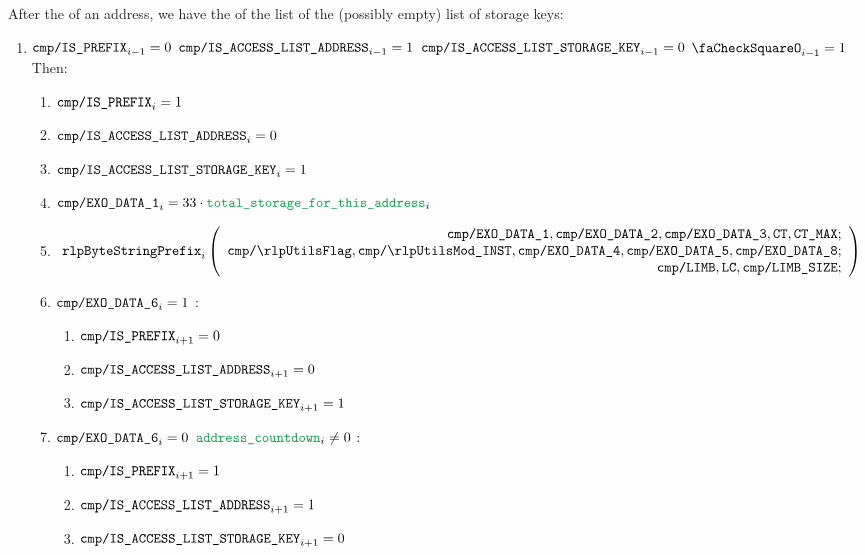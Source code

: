 \begin{enumerate}[resume]
		After the \rlp{} of an address, we have the \rlp{} of the list of the (possibly empty) list of storage keys:
		\begin{enumerate}[resume]
			\item \If $\texttt{cmp}\texttt{/}\texttt{{\texttt{IS\_PREFIX}}} _{i - 1} = 0$ \et $\texttt{cmp}\texttt{/}\texttt{{IS\_ACCESS\_LIST\_ADDRESS}} _{i - 1} = 1$ \et $\texttt{cmp}\texttt{/}\texttt{{IS\_ACCESS\_LIST\_STORAGE\_KEY}} _{i - 1} = 0$ \et $\done _{i - 1} =1$ Then:
				\begin{enumerate}
					\item $\texttt{cmp}\texttt{/}\texttt{{\texttt{IS\_PREFIX}}} _{i} = 1$
					\item $\texttt{cmp}\texttt{/}\texttt{{IS\_ACCESS\_LIST\_ADDRESS}}   _{i} = 0$
					\item $\texttt{cmp}\texttt{/}\texttt{{IS\_ACCESS\_LIST\_STORAGE\_KEY}}    _{i} = 1$
					\item $\rlpTxnComputationColumnExoDataColumn{1} _{i} = 33 \cdot \locTotStorageForThisAddress _{i}$
					\item
						\[
							\rlpBytestringPrefix _{i}
							\left(
							\begin{array}{r}
								\rlpTxnComputationColumnExoDataColumn{1},
								\rlpTxnComputationColumnExoDataColumn{2},
								\rlpTxnComputationColumnExoDataColumn{3},
								\ct,
								\maxCt; \\
								\rlpTxnComputationColumnRlpUtilsFlag,
								\rlpTxnComputationColumnRlpUtilsInstruction,
								\rlpTxnComputationColumnExoDataColumn{4},
								\rlpTxnComputationColumnExoDataColumn{5},
								\rlpTxnComputationColumnExoDataColumn{8}; \\
								\rlpTxnComputationColumnLimb,
								\lc,
								\rlpTxnComputationColumnLimbSize; \\
							\end{array}
							\right)
						\]

					\item \If $\texttt{cmp}\texttt{/}\texttt{{\texttt{EXO\_DATA\_6}}} _{i} = 1$ \Then:
						\begin{enumerate}
							\item $\texttt{cmp}\texttt{/}\texttt{{\texttt{IS\_PREFIX}}} _{i + 1} = 0$
							\item $\texttt{cmp}\texttt{/}\texttt{{IS\_ACCESS\_LIST\_ADDRESS}}   _{i + 1} = 0$
							\item $\texttt{cmp}\texttt{/}\texttt{{IS\_ACCESS\_LIST\_STORAGE\_KEY}}    _{i + 1} = 1$
						\end{enumerate}

					\item \If $\texttt{cmp}\texttt{/}\texttt{{\texttt{EXO\_DATA\_6}}} _{i} = 0$ \et $\locAddressPrewarmingCountdown _{i} \neq 0$ \Then:
						\begin{enumerate}
							\item $\texttt{cmp}\texttt{/}\texttt{{\texttt{IS\_PREFIX}}} _{i + 1} = 1$
							\item $\texttt{cmp}\texttt{/}\texttt{{IS\_ACCESS\_LIST\_ADDRESS}}   _{i + 1} = 1$
							\item $\texttt{cmp}\texttt{/}\texttt{{IS\_ACCESS\_LIST\_STORAGE\_KEY}}    _{i + 1} = 0$
						\end{enumerate}


\end{enumerate}
\end{enumerate}
\end{enumerate}
